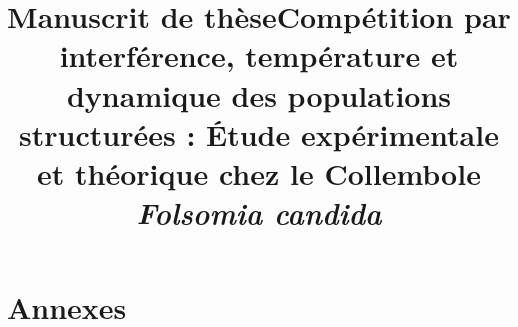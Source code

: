 \documentclass[12pt,a4paper,twoside,openright,final]{memoir}
\title{Manuscrit de thèse}
\makeatletter
\newcommand{\partimage}[2][]{\gdef\@partimage{\texttt{[image: \#2]}}}
\makeatother
\begin{document}
\frontmatter




\begin{Spacing}{1}





\tableofcontents

\end{Spacing}


\mainmatter

\title{Compétition par interférence, température et dynamique des populations
structurées : \'Etude expérimentale et théorique chez le Collembole
\textit{Folsomia candida}}
\newpage

 
\partimage[height=0.9\textwidth]{FigParts/submit}
\part{Annexes}
\appendix
{}

% 




 






\end{document}
